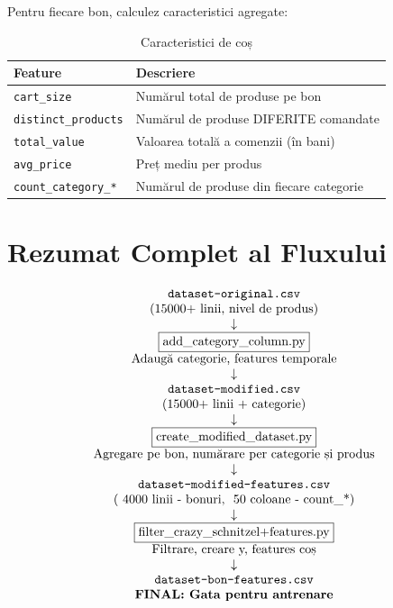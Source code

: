 \documentclass[12pt,a4paper]{article}
\begin{document}
Pentru fiecare bon, calculez caracteristici agregate:

\begin{table}[h]
\centering
\caption{Caracteristici de coș}
\vspace{0.2cm}
\begin{tabular}{ll}
\toprule
\textbf{Feature} & \textbf{Descriere} \\
\midrule
\texttt{cart\_size} & Numărul total de produse pe bon \\
\texttt{distinct\_products} & Numărul de produse DIFERITE comandate \\
\texttt{total\_value} & Valoarea totală a comenzii (în bani) \\
\texttt{avg\_price} & Preț mediu per produs \\
\texttt{count\_category\_*} & Numărul de produse din fiecare categorie \\
\bottomrule
\end{tabular}
\end{table}

\section*{Rezumat Complet al Fluxului}

\[
\begin{array}{c}
\text{\texttt{dataset-original.csv}} \\
\text{(15000+ linii, nivel de produs)} \\
\downarrow \\
\boxed{\text{add\_category\_column.py}} \\
\text{Adaugă categorie, features temporale} \\
\downarrow \\
\text{\texttt{dataset-modified.csv}} \\
\text{(15000+ linii + categorie)} \\
\downarrow \\
\boxed{\text{create\_modified\_dataset.py}} \\
\text{Agregare pe bon, numărare per categorie și produs} \\
\downarrow \\
\text{\texttt{dataset-modified-features.csv}} \\
\text{(~4000 linii - bonuri, ~50 coloane - count\_*)} \\
\downarrow \\
\boxed{\text{filter\_crazy\_schnitzel+features.py}} \\
\text{Filtrare, creare y, features coș} \\
\downarrow \\
\text{\texttt{dataset-bon-features.csv}} \\
\textbf{FINAL: Gata pentru antrenare}
\end{array}
\]
\end{document}
